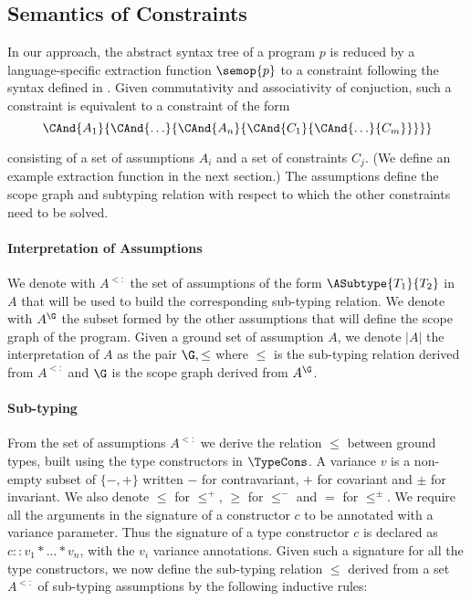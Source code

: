 

\subsection{Semantics of Constraints}

In our approach, the abstract syntax tree of a program $p$ is reduced by a
language-specific extraction function $\semop{p}$ to a constraint following the
syntax defined in . Given commutativity and
associativity of conjuction, such a constraint is equivalent to a constraint of
the form
\vspace*{-2mm}
$$\CAnd{A_1}{\CAnd{\ldots}{\CAnd{A_n}{\CAnd{C_1}{\CAnd{\ldots}{C_m}}}}}\vspace*{-2mm}$$

\noindent consisting of a set of assumptions $A_i$ and a set of constraints
$C_j$. (We define an example extraction function in the next section.) The
assumptions define the scope graph and subtyping relation with respect to which
the other constraints need to be solved.

\paragraph{Interpretation of Assumptions}\label{ssec:assumptionsem}

We denote with $A^{<:}$ the set of assumptions of the form $\ASubtype{T_1}{T_2}$
in $A$ that will be used to build the corresponding sub-typing relation. We
denote with $A^\G$ the subset formed by the other assumptions that will
define the scope graph of the program.
Given a ground set of assumption $A$, we denote $|A|$ the interpretation
of $A$ as the pair $\G,\leq$ where $\leq$ is the sub-typing relation derived
from $A^{<:}$ and $\G$ is the scope graph derived from $A^\G$.


\paragraph{Sub-typing} 

From the set of assumptions $A^{<:}$ we derive the relation $\leq$ between
ground types, built using the type constructors in $\TypeCons$. A variance $v$
is a non-empty subset of $\{-,+\}$ written $-$ for contravariant, $+$ for
covariant and $\pm$ for invariant. We also denote $\leq$ for $\leq^{+}$, $\geq$
for $\leq^{-}$ and $=$ for $\leq^{\pm}$. We require all the arguments in the
signature of a constructor $c$ to be annotated with a variance parameter. Thus
the signature of a type constructor $c$ is declared as $c :: v_1*...* v_n$, with
the $v_i$ variance annotations. Given such a signature for all the type
constructors, we now define the sub-typing relation $\leq$ derived from a set
$A^{<:}$ of sub-typing assumptions by the following inductive rules:

